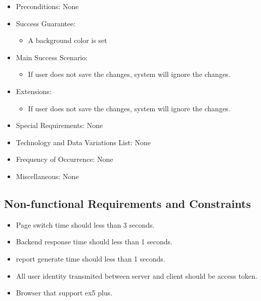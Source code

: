 \documentclass[12pt, a4paper]{article}
\begin{document}
\begin{CJK*}{UTF8}{bkai}
\begin{enumerate}
\begin{itemize}
          \item Preconditions: None
          \item Success Guarantee:
            \begin{itemize}
              \item A background color is set
            \end{itemize}
          \item Main Success Scenario:
            \begin{itemize}
              \item If user does not save the changes, system will ignore the changes.
            \end{itemize}
          \item Extensions:
            \begin{itemize}
              \item If user does not save the changes, system will ignore the changes.
            \end{itemize}
          \item Special Requirements: None
          \item Technology and Data Variations List: None
          \item Frequency of Occurrence: None
          \item Miscellaneous: None
        \end{itemize}
    \end{enumerate}
  \subsection{Non-functional Requirements and Constraints}
    \begin{itemize}
      \item Page switch time should less than 3 seconds.
      \item Backend response time should less than 1 seconds.
      \item report generate time should less than 1 seconds.
      \item All user identity transmited between server and client should be access token.
    \end{itemize}
    \begin{itemize}
      \item Browser that support ex5 plus.
    \end{itemize}

\end{CJK*}
\end{document}
